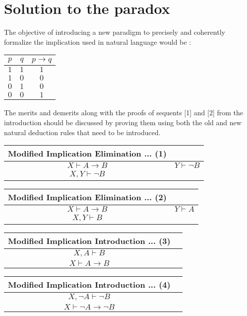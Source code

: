 \documentclass[a4paper]{article}
\begin{document}
\section*{Solution to the paradox}
The objective of introducing a new paradigm to precisely and coherently formalize the implication used in natural language would be :
\begin{center}
	\begin{tabular}{|c|c|c|}
		$p$ & $q$ & $p \rightarrow q$ \\
		\midrule
		$1$ & $1$ & $1$ \\
		$1$ & $0$ & $0$ \\
		$0$ & $1$ & $0$ \\
		$0$ & $0$ & $1$ \\	
	\end{tabular}
\end{center}
\pagebreak
The merits and demerits along with the proofs of sequents [1] and [2] from the introduction should be discussed by proving them using both the old and new natural deduction rules that need to be introduced.\\
\begin{center}
		\begin{tabular}{c c}
			 Modified Implication Elimination ... (1)\\
			\midrule 
			 $X\vdash A \rightarrow B $ & $ Y\vdash \lnot B$  \\ 	\midrule
			  \hspace{5em} $X,Y \vdash \lnot B$
	\end{tabular}
\end{center}

\begin{center}
	\begin{tabular}{c c}
		Modified Implication Elimination ... (2)\\
		\midrule 
		$X\vdash A \rightarrow B $ & $ Y\vdash A$  \\ 	\midrule
		\hspace{5em} $X,Y \vdash  B$
		
		
	\end{tabular}
\end{center}

\begin{center}
	\begin{tabular}{c c}
		Modified Implication Introduction ... (3)\\
		\midrule 
		$X,A\vdash B $  \\ 	\midrule
		\hspace{5em} $X\vdash A\rightarrow B$
	\end{tabular}
\end{center}

\begin{center}
	\begin{tabular}{c c}
		Modified Implication Introduction ... (4)\\
		\midrule 
		$X,\lnot A \vdash \lnot B $  \\ \midrule
		\hspace{5em} $X \vdash \lnot A \rightarrow \lnot B$
		
		
	\end{tabular}
\end{center}


	
\end{document}
